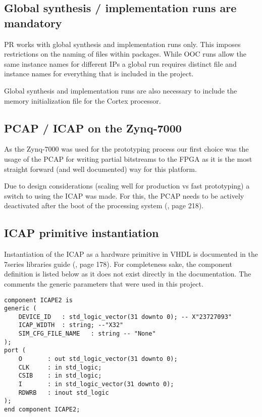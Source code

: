 \subsection{Global synthesis / implementation runs are mandatory}
\gls{PR} works with global synthesis and implementation runs only.
This imposes restrictions on the naming of files within packages. 
While \gls{OOC} runs allow the same instance names for different IPs a global run requires distinct file and instance names for everything that is included in the project.

Global synthesis and implementation runs are also necessary to include the memory initialization file for the Cortex processor. 

\subsection{\gls{PCAP} / \gls{ICAP} on the Zynq-7000}
As the Zynq-7000 was used for the prototyping process our first choice was the usage of the \gls{PCAP} for writing partial bitstreams to the \gls{FPGA} as it is the most straight forward (and well documented) way for this platform.

Due to design considerations (scaling well for production vs fast prototyping) a switch to using the \gls{ICAP} was made.
For this, the \gls{PCAP} needs to be actively deactivated after the boot of the processing system (\cite{zynq_7000_technical_manual}, page 218).

\subsection{\gls{ICAP} primitive instantiation}
Instantiation of the \gls{ICAP} as a hardware primitive in VHDL is documented in the 7series libraries guide (\cite{7series_libraries_guide}, page 178).
For completeness sake, the component definition is listed below as it does not exist directly in the documentation.
The comments the generic parameters that were used in this project.
\lstset{language=vhdl}
\begin{lstlisting}[caption={Component definition of the ICAPE2.}]
component ICAPE2 is
generic (
    DEVICE_ID   : std_logic_vector(31 downto 0); -- X"23727093" 
    ICAP_WIDTH  : string; --"X32"
    SIM_CFG_FILE_NAME 	: string -- "None"
);   
port (
    O 		: out std_logic_vector(31 downto 0);
    CLK 	: in std_logic;
    CSIB 	: in std_logic;
    I 		: in std_logic_vector(31 downto 0);
    RDWRB 	: inout std_logic
);
end component ICAPE2;
\end{lstlisting}
